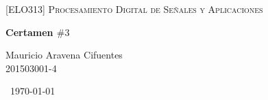 \documentclass[a4paper]{article}
\begin{document}
\begin{titlepage}
	\centering
	{\scshape\LARGE [ELO313] Procesamiento Digital de Señales y Aplicaciones\par}
	\vspace{1cm}
	\vspace{5cm}	
	{\huge\bfseries Certamen $\#3$ \par}
	\vspace{9cm}
	{\Large\Large Mauricio Aravena Cifuentes \\ 201503001-4}
	\vfill
	{\large \ \today \par}
\end{titlepage}

\newpage



%
\end{document}
